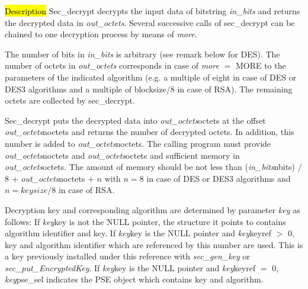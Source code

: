 


\hl{Description}
Sec\_decrypt decrypts the input data of bitstring {\em in\_bits} and returns the decrypted data
in {\em out\_octets}. Several successive calls of sec\_decrypt can be chained
to one decryption process by means of {\em more}.
          
The number of bits in {\em in\_bits} is arbitrary (see remark below for DES). The number of octets in {\em out\_octets}
corresponds in case of {\em more} $=$ MORE to the parameters of the indicated algorithm
(e.g. a multiple of eight in case of DES or DES3 algorithms and a multiple of blocksize/8
in case of RSA). The remaining octets are collected by sec\_decrypt.

Sec\_decrypt puts the decrypted data into {\em out\_octets}\pf octets at the offset
{\em out\_octets}\pf noctets and returns the number of decrypted octets. In addition, this number is added 
to {\em out\_octets}\pf noctets.
The calling program must provide {\em out\_octets}\pf noctets and {\em out\_octets}\pf octets and sufficient
memory in {\em out\_octets}\pf octets. 
The amount of memory should be not less than
({\em in\_bits}\pf nbits) $/$ 8 $+$ {\em out\_octets}\pf noctets $+$ $n$ with $n = 8$ 
in case of DES or DES3 algorithms and $n = keysize / 8$ in case of RSA.

Decryption key and corresponding algorithm are determined by parameter {\em key} as follows:
\be
\m If {\em key}\pf key is not the NULL pointer, the structure it points to
   contains algorithm identifier and key.
\m If {\em key}\pf key is the NULL pointer and {\em key}\pf keyref $>$ 0,
   key and algorithm identifier which are referenced by this number are used. This is a key
   previously installed under this reference with {\em sec\_gen\_key} or 
   {\em sec\_put\_EncryptedKey}.
\m If {\em key}\pf key is the NULL pointer and {\em key}\pf keyref $=$ 0,
   {\em key}\pf pse\_sel indicates the PSE object which contains key and algorithm.
\ee

